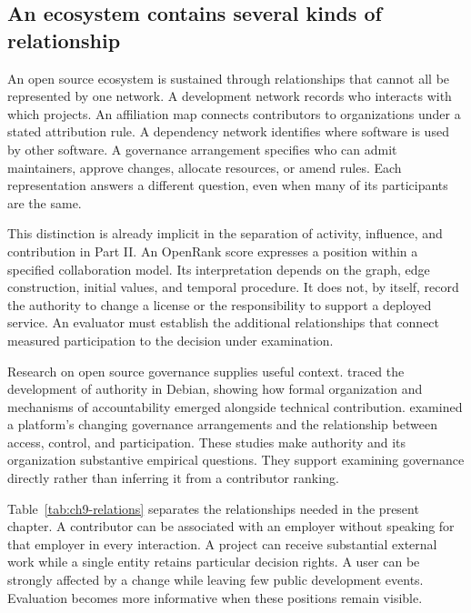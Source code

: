 \subsection{An ecosystem contains several kinds of relationship}
An open source ecosystem is sustained through relationships that cannot all be represented by one network. A development network records who interacts with which projects. An affiliation map connects contributors to organizations under a stated attribution rule. A dependency network identifies where software is used by other software. A governance arrangement specifies who can admit maintainers, approve changes, allocate resources, or amend rules. Each representation answers a different question, even when many of its participants are the same.

This distinction is already implicit in the separation of activity, influence, and contribution in Part II. An OpenRank score expresses a position within a specified collaboration model. Its interpretation depends on the graph, edge construction, initial values, and temporal procedure. It does not, by itself, record the authority to change a license or the responsibility to support a deployed service. An evaluator must establish the additional relationships that connect measured participation to the decision under examination.

Research on open source governance supplies useful context. \citet{omahony2007} traced the development of authority in Debian, showing how formal organization and mechanisms of accountability emerged alongside technical contribution. \citet{omahony2022} examined a platform's changing governance arrangements and the relationship between access, control, and participation. These studies make authority and its organization substantive empirical questions. They support examining governance directly rather than inferring it from a contributor ranking.

Table~\ref{tab:ch9-relations} separates the relationships needed in the present chapter. A contributor can be associated with an employer without speaking for that employer in every interaction. A project can receive substantial external work while a single entity retains particular decision rights. A user can be strongly affected by a change while leaving few public development events. Evaluation becomes more informative when these positions remain visible.



